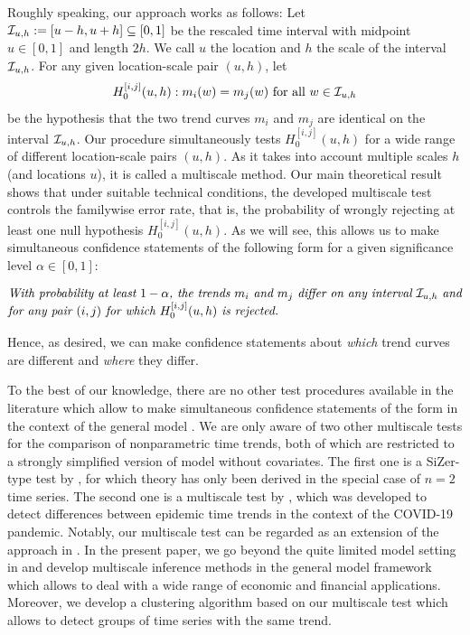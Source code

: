 \documentclass[a4paper,12pt]{article}
\makeatletter
\renewcommand{\eqref}[1]{\tagform@{\ref{#1}}}
\makeatother
\begin{document}
Roughly speaking, our approach works as follows: Let $\mathcal{I}_{u, h} := [u-h,u+h] \subseteq [0,1]$ be the rescaled time interval with midpoint $u \in [0,1]$ and length $2h$. We call $u$ the location and $h$ the scale of the interval $\mathcal{I}_{u, h}$. For any given location-scale pair $(u,h)$, let
\[ H_0^{[i, j]}(u, h): m_i(w) = m_j(w) \text{ for all } w \in \mathcal{I}_{u, h} \] 
be the hypothesis that the two trend curves $m_i$ and $m_j$ are identical on the interval $\mathcal{I}_{u, h}$. Our procedure simultaneously tests $H_0^{[i, j]}(u, h)$ for a wide range of different location-scale pairs $(u,h)$. As it takes into account multiple scales $h$ (and locations $u$), it is called a multiscale method. Our main theoretical result shows that under suitable technical conditions, the developed multiscale test controls the familywise error rate, that is, the probability of wrongly rejecting at least one null hypothesis $H_0^{[i, j]}(u, h)$. As we will see, this allows us to make simultaneous confidence statements of the following form for a given significance level $\alpha \in [0,1]$: 
\begin{equation}\label{eq:conf-statement}
\begin{minipage}[c][1.25cm][c]{13cm}
\textit{With probability at least $1-\alpha$, the trends $m_i$ and $m_j$ differ on any interval $\interval$ and for any pair $(i,j)$ for which $H_0^{[i, j]}(u, h)$ is rejected.} 
\end{minipage}
\end{equation}
Hence, as desired, we can make confidence statements about \textit{which} trend curves are different and \textit{where} they differ.


To the best of our knowledge, there are no other test procedures available in the literature which allow to make simultaneous confidence statements of the form \eqref{eq:conf-statement} in the context of the general model \eqref{eq:model}. We are only aware of two other multiscale tests for the comparison of nonparametric time trends, both of which are restricted to a strongly simplified version of model \eqref{eq:model} without covariates. The first one is a SiZer-type test by \cite{Park2009}, for which theory has only been derived in the special case of $n=2$ time series. The second one is a multiscale test by \cite{KhismatullinaVogt2021}, which was developed to detect differences between epidemic time trends in the context of the COVID-19 pandemic. Notably, our multiscale test can be regarded as an extension of the approach in \cite{KhismatullinaVogt2021}. In the present paper, we go beyond the quite limited model setting in \cite{KhismatullinaVogt2021} and develop multiscale inference methods in the general model framework \eqref{eq:model} which allows to deal with a wide range of economic and financial applications. Moreover, we develop a clustering algorithm based on our multiscale test which allows to detect groups of time series with the same trend. 
\end{document}
